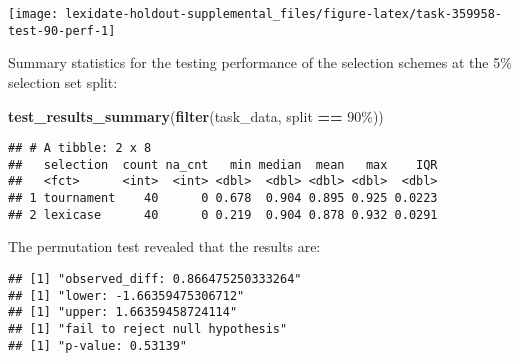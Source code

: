 \documentclass[
]{book}
\newenvironment{Shaded}{\begin{snugshade}}{\end{snugshade}}
\newcommand{\AttributeTok}[1]{\textcolor[rgb]{0.13,0.29,0.53}{#1}}
\newcommand{\DecValTok}[1]{\textcolor[rgb]{0.00,0.00,0.81}{#1}}
\newcommand{\FunctionTok}[1]{\textcolor[rgb]{0.13,0.29,0.53}{\textbf{#1}}}
\newcommand{\NormalTok}[1]{#1}
\newcommand{\OtherTok}[1]{\textcolor[rgb]{0.56,0.35,0.01}{#1}}
\newcommand{\SpecialCharTok}[1]{\textcolor[rgb]{0.81,0.36,0.00}{\textbf{#1}}}
\newcommand{\StringTok}[1]{\textcolor[rgb]{0.31,0.60,0.02}{#1}}
\begin{document}
\texttt{[image: lexidate-holdout-supplemental\_files/figure-latex/task-359958-test-90-perf-1]}

Summary statistics for the testing performance of the selection schemes at the 5\% selection set split:

\begin{Shaded}
\begin{Highlighting}[]
\FunctionTok{test\_results\_summary}\NormalTok{(}\FunctionTok{filter}\NormalTok{(task\_data, split }\SpecialCharTok{==} \StringTok{\textquotesingle{}90\%\textquotesingle{}}\NormalTok{))}
\end{Highlighting}
\end{Shaded}

\begin{verbatim}
## # A tibble: 2 x 8
##   selection  count na_cnt   min median  mean   max    IQR
##   <fct>      <int>  <int> <dbl>  <dbl> <dbl> <dbl>  <dbl>
## 1 tournament    40      0 0.678  0.904 0.895 0.925 0.0223
## 2 lexicase      40      0 0.219  0.904 0.878 0.932 0.0291
\end{verbatim}

The permutation test revealed that the results are:

\begin{Shaded}
\end{Shaded}

\begin{verbatim}
## [1] "observed_diff: 0.866475250333264"
## [1] "lower: -1.66359475306712"
## [1] "upper: 1.66359458724114"
## [1] "fail to reject null hypothesis"
## [1] "p-value: 0.53139"
\end{verbatim}
\end{document}

